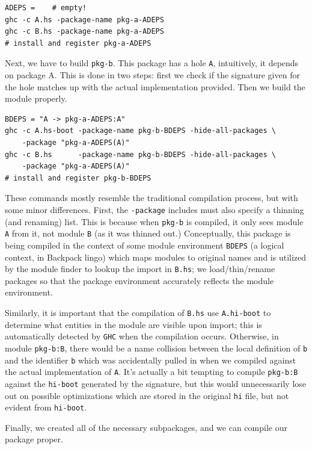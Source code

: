 \documentclass{article}
\begin{document}
\begin{verbatim}
ADEPS =    # empty!
ghc -c A.hs -package-name pkg-a-ADEPS
ghc -c B.hs -package-name pkg-a-ADEPS
# install and register pkg-a-ADEPS
\end{verbatim}

Next, we have to build \verb|pkg-b|.  This package has a hole \verb|A|,
intuitively, it depends on package A.   This is done in two steps:
first we check if the signature given for the hole matches up with the
actual implementation provided. Then we build the module properly.

\begin{verbatim}
BDEPS = "A -> pkg-a-ADEPS:A"
ghc -c A.hs-boot -package-name pkg-b-BDEPS -hide-all-packages \
    -package "pkg-a-ADEPS(A)"
ghc -c B.hs      -package-name pkg-b-BDEPS -hide-all-packages \
    -package "pkg-a-ADEPS(A)"
# install and register pkg-b-BDEPS
\end{verbatim}

These commands mostly resemble the traditional compilation process, but
with some minor differences.  First, the \verb|-package| includes must
also specify a thinning (and renaming) list.  This is because when
\verb|pkg-b| is compiled, it only sees module \verb|A| from it, not
module \verb|B| (as it was thinned out.)  Conceptually, this package is
being compiled in the context of some module environment \verb|BDEPS| (a
logical context, in Backpack lingo) which maps modules to original names
and is utilized by the module finder to lookup the import in
\verb|B.hs|; we load/thin/rename packages so that the package
environment accurately reflects the module environment.

Similarly, it is important that the compilation of \verb|B.hs| use \verb|A.hi-boot|
to determine what entities in the module are visible upon import; this is
automatically detected by \verb|GHC| when the compilation occurs.  Otherwise,
in module \verb|pkg-b:B|, there would be a name collision between the local
definition of \verb|b| and the identifier \verb|b| which was
accidentally pulled in when we compiled against the actual implementation of
\verb|A|.  It's actually a bit tempting to compile \verb|pkg-b:B| against the
\verb|hi-boot| generated by the signature, but this would unnecessarily
lose out on possible optimizations which are stored in the original \verb|hi|
file, but not evident from \verb|hi-boot|.

Finally, we created all of the necessary subpackages, and we can compile
our package proper.
\end{document}
